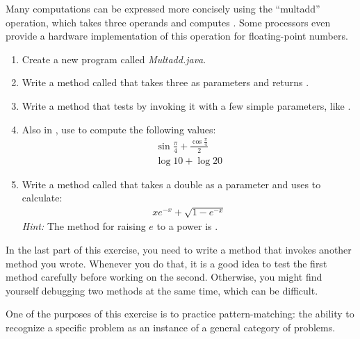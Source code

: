 \begin{exercise}  %

Many computations can be expressed more concisely using the ``multadd'' operation, which takes three operands and computes .
Some processors even provide a hardware implementation of this operation for floating-point numbers.

\begin{enumerate}

\item Create a new program called {\it Multadd.java}.

\item Write a method called  that takes three  as parameters and returns .

\item Write a  method that tests  by invoking it with a few simple parameters, like .

\item Also in , use  to compute the following values:
%
\begin{eqnarray*}
& \sin \frac{\pi}{4} + \frac{\cos \frac{\pi}{4}}{2} & \\
& \log 10 + \log 20 &
\end{eqnarray*}

\item Write a method called  that takes a double as a parameter and uses  to calculate:
%
\begin{eqnarray*}
x e^{-x} + \sqrt{1 - e^{-x}}
\end{eqnarray*}
%
{\em Hint:} The method for raising $e$ to a power is .

\end{enumerate}

In the last part of this exercise, you need to write a method that invokes another method you wrote.
Whenever you do that, it is a good idea to test the first method carefully before working on the second.
Otherwise, you might find yourself debugging two methods at the same time, which can be difficult.

One of the purposes of this exercise is to practice pattern-matching: the ability to recognize a specific problem as an instance of a general category of problems.

\end{exercise}

